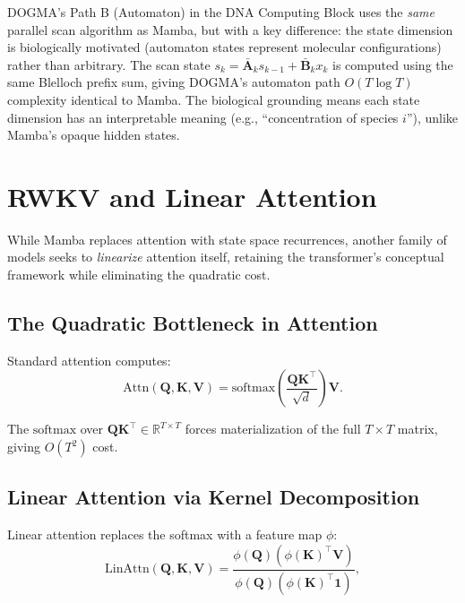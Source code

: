 \begin{implnote}
DOGMA's Path B (Automaton) in the DNA Computing Block uses the \emph{same} parallel scan algorithm as Mamba, but with a key difference: the state dimension is biologically motivated (automaton states represent molecular configurations) rather than arbitrary. The scan state $s_k = \bar{\mathbf{A}}_k s_{k-1} + \bar{\mathbf{B}}_k x_k$ is computed using the same Blelloch prefix sum, giving DOGMA's automaton path $O(T \log T)$ complexity identical to Mamba. The biological grounding means each state dimension has an interpretable meaning (e.g., ``concentration of species $i$''), unlike Mamba's opaque hidden states.
\end{implnote}

\section{RWKV and Linear Attention}
\label{sec:rwkv}

While Mamba replaces attention with state space recurrences, another family of models seeks to \emph{linearize} attention itself, retaining the transformer's conceptual framework while eliminating the quadratic cost.

\subsection{The Quadratic Bottleneck in Attention}

Standard attention computes:
\begin{equation}
\text{Attn}(\mathbf{Q}, \mathbf{K}, \mathbf{V}) = \text{softmax}\!\left(\frac{\mathbf{Q}\mathbf{K}^\top}{\sqrt{d}}\right)\mathbf{V}.
\end{equation}

The $\text{softmax}$ over $\mathbf{Q}\mathbf{K}^\top \in \mathbb{R}^{T \times T}$ forces materialization of the full $T \times T$ matrix, giving $O(T^2)$ cost.

\subsection{Linear Attention via Kernel Decomposition}

Linear attention \citep{katharopoulos2020} replaces the softmax with a feature map $\phi$:
\begin{equation}
\text{LinAttn}(\mathbf{Q}, \mathbf{K}, \mathbf{V}) = \frac{\phi(\mathbf{Q}) \left(\phi(\mathbf{K})^\top \mathbf{V}\right)}{\phi(\mathbf{Q}) \left(\phi(\mathbf{K})^\top \mathbf{1}\right)},
\label{eq:linear-attention}
\end{equation}

